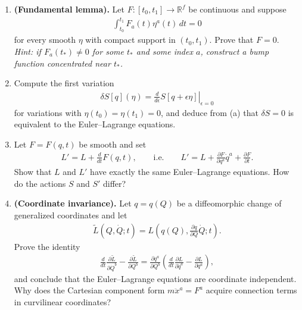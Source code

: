 \documentclass[12pt]{article}
\begin{document}
\begin{enumerate}
\item[(a)] \textbf{(Fundamental lemma).}
Let \(F:[t_0,t_1]\to\mathbb{R}^f\) be continuous and suppose
\begin{align*}
\int_{t_0}^{t_1}F_a(t)\eta^a(t)\,dt=0
\end{align*}
for every smooth \(\eta\) with compact support in \((t_0,t_1)\).
Prove that \(F=0\).
\textit{Hint: if \(F_a(t_*)\neq 0\) for some \(t_*\) and some index \(a\),
construct a bump function concentrated near \(t_*\).}

\item[(b)] Compute the first variation
\begin{align*}
\delta S[q](\eta)
=
\left.
\frac{d}{d\epsilon}S[q+\epsilon\eta]
\right|_{\epsilon=0}
\end{align*}
for variations with \(\eta(t_0)=\eta(t_1)=0\), and deduce from (a) that
\(\delta S=0\) is equivalent to the Euler--Lagrange equations.

\item[(c)] Let \(F=F(q,t)\) be smooth and set
\begin{align*}
L'
=
L+\frac{d}{dt}F(q,t),
\qquad\text{i.e.}\qquad
L'
=
L+\frac{\partial F}{\partial q^a}\dot q^a
+\frac{\partial F}{\partial t}.
\end{align*}
Show that \(L\) and \(L'\) have exactly the same Euler--Lagrange equations.
How do the actions \(S\) and \(S'\) differ?

\item[(d)] \textbf{(Coordinate invariance).}
Let \(q=q(Q)\) be a diffeomorphic change of generalized coordinates and let
\begin{align*}
\widetilde L(Q,\dot Q;t)
=
L\left(q(Q),\frac{\partial q}{\partial Q}\dot Q;t\right).
\end{align*}
Prove the identity
\begin{align*}
\frac{d}{dt}\frac{\partial\widetilde L}{\partial \dot Q^b}
-
\frac{\partial\widetilde L}{\partial Q^b}
=
\frac{\partial q^a}{\partial Q^b}
\left(
\frac{d}{dt}\frac{\partial L}{\partial\dot q^a}
-
\frac{\partial L}{\partial q^a}
\right),
\end{align*}
and conclude that the Euler--Lagrange equations are coordinate independent.
Why does the Cartesian component form \(m\ddot x^a=F^a\) acquire connection
terms in curvilinear coordinates?
\end{enumerate}
\end{document}
